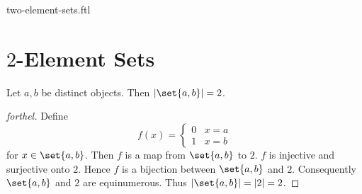 \documentclass{naproche-library}
\begin{document}
\begin{smodule}{two-element-sets.ftl}

  \section*{$2$-Element Sets}

  \begin{proposition}[forthel,id=SET_THEORY_07_5465279026954240]
    Let $a, b$ be distinct objects.
    Then $|\set{a,b}| = 2$.
  \end{proposition}
  \begin{proof}[forthel]
    Define \[ f(x) =
      \begin{cases}
        0 & x = a
        \\
        1 & x = b
      \end{cases} \]
    for $x \in \set{a,b}$.
    Then $f$ is a map from $\set{a,b}$ to $2$.
    $f$ is injective and surjective onto $2$.
    Hence $f$ is a bijection between $\set{a,b}$ and $2$.
    Consequently $\set{a,b}$ and $2$ are equinumerous.
    Thus $|\set{a,b}| = |2| = 2$.
  \end{proof}
\end{smodule}
\end{document}
